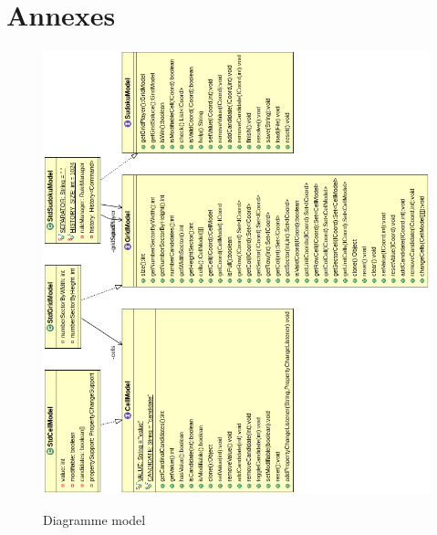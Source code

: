 \section{Annexes}
\begin{figure}[ht]
  \caption{\label{annexe16} Diagramme model}
  \includegraphics [width=160mm]{images/model.png} \\[0.5cm]
\end{figure}

